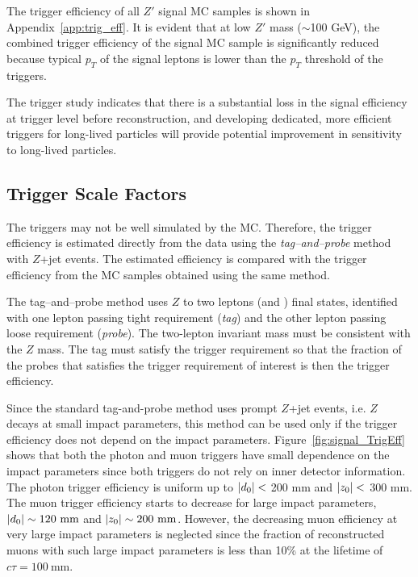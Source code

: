 The trigger efficiency of all $Z'$ signal MC samples is shown in Appendix~\ref{app:trig_eff}. It is evident that at low $Z'$ mass ($\sim$100 GeV), the combined trigger efficiency of the signal MC sample is significantly reduced because typical $p_{T}$ of the signal leptons is lower than the $p_{T}$ threshold of the triggers.

The trigger study indicates that there is a substantial loss in the signal efficiency at trigger level before reconstruction, and developing dedicated, more efficient triggers for long-lived particles will provide potential improvement in sensitivity to long-lived particles. 


\subsection{Trigger Scale Factors}
\label{sec:syst:trigger}

The triggers may not be well simulated by the MC. Therefore, the trigger efficiency is estimated directly from the data using the \textit{tag--and--probe} method with $Z$+jet events. The estimated efficiency is compared with the trigger efficiency from the MC samples obtained using the same method. 

The tag--and--probe method uses $Z$ to two leptons (\ee and \mumu) final states, identified with one lepton passing tight requirement (\textit{tag}) and the other lepton passing loose requirement (\textit{probe}). The two-lepton invariant mass must be consistent with the $Z$ mass. The tag must satisfy the trigger requirement so that the fraction of the probes that satisfies the trigger requirement of interest is then the trigger efficiency.

Since the standard tag-and-probe method uses prompt $Z$+jet events, i.e. $Z$ decays at small impact parameters, this method can be used only if the trigger efficiency does not depend on the impact parameters. Figure~\ref{fig:signal_TrigEff} shows that both the photon and muon triggers have small dependence on the impact parameters since both triggers do not rely on inner detector information. The photon trigger efficiency is uniform up to $|d_{0}| <$ 200 mm and $|z_{0}| <$ 300 mm. The muon trigger efficiency starts to decrease for large impact parameters, $|\dzero| \sim120~\si{\mm}$ and $|\zzero| \sim200~\si{\mm}$. However, the decreasing muon efficiency at very large impact parameters is neglected since the fraction of reconstructed muons with such large impact parameters is less than 10\% at the lifetime of $c\tau=100~\si{\mm}$.


